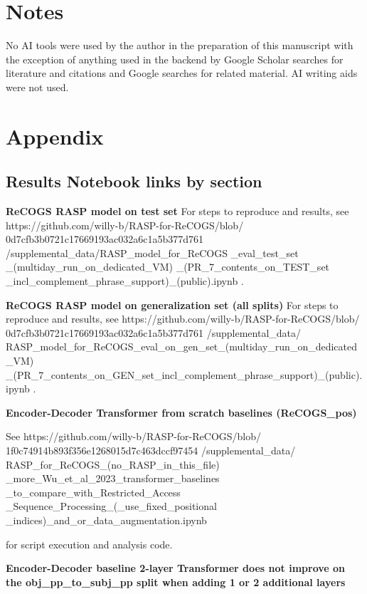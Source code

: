 \documentclass[11pt]{article}
\begin{document}


\section*{Notes}
No AI tools were used by the author in the preparation of this manuscript with the exception of anything used in the backend by Google Scholar searches for literature and citations and Google searches for related material. AI writing aids were not used.
\clearpage

\section{Appendix}

\subsection{Results Notebook links by section}
\label{results_notebook_links_by_section}

\textbf{ReCOGS RASP model on test set}
For steps to reproduce and results, see https://github.com/willy-b/RASP-for-ReCOGS/blob/
0d7cfb3b0721c17669193ac032a6c1a5b377d761
/supplemental\_data/RASP\_model\_for\_ReCOGS
\_eval\_test\_set
\_(multiday\_run\_on\_dedicated\_VM)
\_(PR\_7\_contents\_on\_TEST\_set
\_incl\_complement\_phrase\_support)\_(public).ipynb .

\textbf{ReCOGS RASP model on generalization set (all splits)}
For steps to reproduce and results, see https://github.com/willy-b/RASP-for-ReCOGS/blob/
0d7cfb3b0721c17669193ac032a6c1a5b377d761
/supplemental\_data/
RASP\_model\_for\_ReCOGS\_eval\_on\_gen\_set\_(multiday\_run\_on\_dedicated\_VM)
\_(PR\_7\_contents\_on\_GEN\_set\_incl\_complement\_phrase\_support)\_(public).ipynb .

\textbf{\cite{Wu2023} Encoder-Decoder Transformer from scratch baselines (ReCOGS\_pos)}

See https://github.com/willy-b/RASP-for-ReCOGS/blob/
1f0c74914b893f356e1268015d7c463dccf97454
/supplemental\_data/
RASP\_for\_ReCOGS\_(no\_RASP\_in\_this\_file)
\_more\_Wu\_et\_al\_2023\_transformer\_baselines
\_to\_compare\_with\_Restricted\_Access
\_Sequence\_Processing\_(\_use\_fixed\_positional
\_indices)\_and\_or\_data\_augmentation.ipynb

for \cite{Wu2023} script execution and analysis code.

\textbf{\cite{Wu2023} Encoder-Decoder baseline 2-layer Transformer does not improve on the obj\_pp\_to\_subj\_pp split when adding 1 or 2 additional layers}
\end{document}
